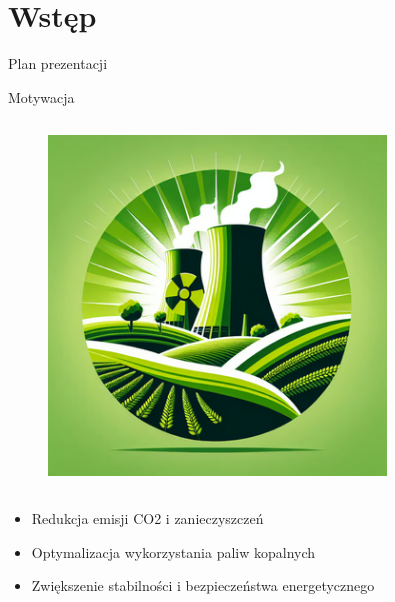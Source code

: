 \section{Wstęp}

\begin{frame}{Plan prezentacji}
    \tableofcontents
\end{frame}

\begin{columnframe}{Motywacja}
    \begin{column}{0.5\textwidth}
        \begin{figure}
            \centering
            \includegraphics[width=0.8\textwidth, frame]{images/green_nuclear_stock.png}
        \end{figure}
    \end{column}
    \begin{column}{0.5\textwidth}
        \begin{itemize}
            \item Redukcja emisji CO2 i zanieczyszczeń
            \item Optymalizacja wykorzystania paliw kopalnych
            \item Zwiększenie stabilności i bezpieczeństwa energetycznego
        \end{itemize}
    \end{column}
\end{columnframe}

